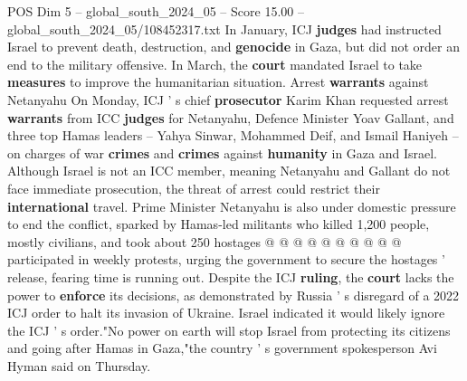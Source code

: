 \begin{textsample}{POS Dim 5 – global\_south\_2024\_05 – Score 15.00 – global\_south\_2024\_05/108452317.txt}
In January, ICJ \textbf{judges} had instructed Israel to prevent death, destruction, and \textbf{genocide} in Gaza, but did not order an end to the military offensive.
In March, the \textbf{court} mandated Israel to take \textbf{measures} to improve the humanitarian situation.
Arrest \textbf{warrants} against Netanyahu On Monday, ICJ ' s chief \textbf{prosecutor} Karim Khan requested arrest \textbf{warrants} from ICC \textbf{judges} for Netanyahu, Defence Minister Yoav Gallant, and three top Hamas leaders -- Yahya Sinwar, Mohammed Deif, and Ismail Haniyeh -- on charges of war \textbf{crimes} and \textbf{crimes} against \textbf{humanity} in Gaza and Israel.
Although Israel is not an ICC member, meaning Netanyahu and Gallant do not face immediate prosecution, the threat of arrest could restrict their \textbf{international} travel.
Prime Minister Netanyahu is also under domestic pressure to end the conflict, sparked by Hamas-led militants who killed 1,200 people, mostly civilians, and took about 250 hostages @ @ @ @ @ @ @ @ @ @ participated in weekly protests, urging the government to secure the hostages ' release, fearing time is running out.
Despite the ICJ \textbf{ruling}, the \textbf{court} lacks the power to \textbf{enforce} its decisions, as demonstrated by Russia ' s disregard of a 2022 ICJ order to halt its invasion of Ukraine.
Israel indicated it would likely ignore the ICJ ' s order."No power on earth will stop Israel from protecting its citizens and going after Hamas in Gaza,"the country ' s government spokesperson Avi Hyman said on Thursday.

\end{textsample}

